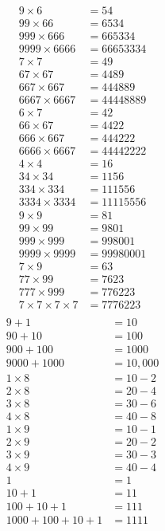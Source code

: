 \begin{align*}
9 \times 6 &= 54\\
99 \times 66 &= 6534\\
999 \times 666 &= 665334 \\
9999 \times 6666 &= 66653334\\[0.5cm]
7\times 7 &= 49\\ %
67 \times 67 &= 4489\\
667 \times 667 &= 444889 \\
6667 \times 6667 &= 44448889\\[0.5cm]
6\times 7 &= 42\\
66 \times 67 &= 4422 \\
666 \times 667 &= 444222\\
6666 \times 6667 &= 44442222\\[0.5cm]
4\times 4 &= 16\\ %
34 \times 34 &= 1156\\
334 \times 334 &= 111556\\
3334 \times 3334 &= 11115556\\[0.5cm]
9\times 9 &= 81\\ %
99\times 99&= 9801\\
999 \times 999 &= 998001\\
9999 \times 9999 &= 99980001\\[0.5cm]
7 \times 9 &= 63\\ %
77 \times 99 &= 7623\\
777 \times 999 &= 776223\\
7\times 7\times 7 \times 7 &= 7776223\\[0.5cm]
\end{align*}
\begin{align*}
9+1 &= 10\\ 
90+10 &= 100\\
900+100 &= 1000\\
9000+1000 &= 10,000\\[0.5cm]
1 \times 8 &= 10-2 \\%
2 \times 8 &= 20-4 \\
3 \times 8 &= 30-6 \\
4 \times 8 &= 40-8 \\[0.5cm]
1 \times 9 &= 10-1\\%
2 \times 9 &= 20-2 \\
3 \times 9 &= 30-3\\
4 \times 9 &= 40-4\\[0.5cm]
1 &= 1\\%
10+1 &= 11\\
100+10+1 &= 111\\
1000+100+10+1 &= 1111
\end{align*}
